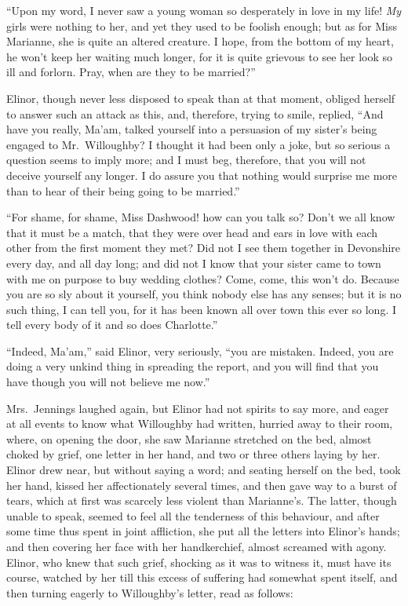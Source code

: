 \documentclass{article}
\begin{document}
``Upon my word, I never saw a young woman so
desperately in love in my life!  \emph{My} girls were nothing
to her, and yet they used to be foolish enough; but as
for Miss Marianne, she is quite an altered creature.
I hope, from the bottom of my heart, he won't keep her
waiting much longer, for it is quite grievous to see her
look so ill and forlorn.  Pray, when are they to be married?''

Elinor, though never less disposed to speak than at
that moment, obliged herself to answer such an attack
as this, and, therefore, trying to smile, replied, ``And have
you really, Ma'am, talked yourself into a persuasion
of my sister's being engaged to Mr.\ Willoughby?  I thought
it had been only a joke, but so serious a question seems
to imply more; and I must beg, therefore, that you will not
deceive yourself any longer.  I do assure you that nothing
would surprise me more than to hear of their being going
to be married.''

``For shame, for shame, Miss Dashwood! how can you
talk so?  Don't we all know that it must be a match, that
they were over head and ears in love with each other from
the first moment they met?  Did not I see them together
in Devonshire every day, and all day long; and did not I
know that your sister came to town with me on purpose
to buy wedding clothes?  Come, come, this won't do.
Because you are so sly about it yourself, you think nobody
else has any senses; but it is no such thing, I can tell you,
for it has been known all over town this ever so long.
I tell every body of it and so does Charlotte.''

``Indeed, Ma'am,'' said Elinor, very seriously,
``you are mistaken.  Indeed, you are doing a very unkind thing
in spreading the report, and you will find that you have
though you will not believe me now.''

Mrs.\ Jennings laughed again, but Elinor had not
spirits to say more, and eager at all events to know
what Willoughby had written, hurried away to their room,
where, on opening the door, she saw Marianne stretched on
the bed, almost choked by grief, one letter in her hand,
and two or three others laying by her.  Elinor drew near,
but without saying a word; and seating herself on the bed,
took her hand, kissed her affectionately several times,
and then gave way to a burst of tears, which at first
was scarcely less violent than Marianne's. The latter,
though unable to speak, seemed to feel all the tenderness
of this behaviour, and after some time thus spent in
joint affliction, she put all the letters into Elinor's hands;
and then covering her face with her handkerchief,
almost screamed with agony.  Elinor, who knew that such grief,
shocking as it was to witness it, must have its course,
watched by her till this excess of suffering had somewhat
spent itself, and then turning eagerly to Willoughby's letter,
read as follows:
\end{document}

